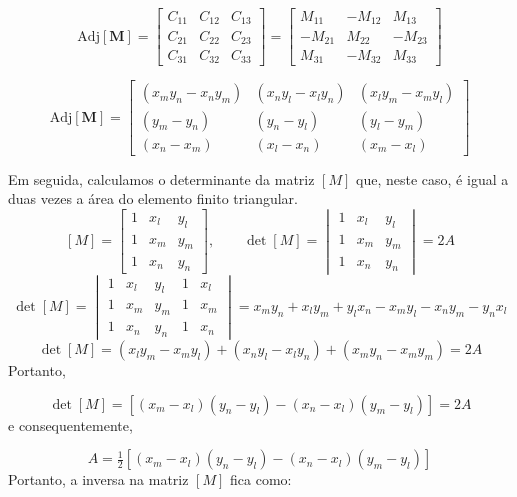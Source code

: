 \documentclass[
12pt,
a4paper,
oneside,
chapter=TITLE,
sumario=tradicional
]{abntex2}
\begin{document}
$$
\text{Adj}[\mathbf{M}] =
\begin{bmatrix}
	C_{11} & C_{12} & C_{13} \\
	C_{21} & C_{22} & C_{23} \\
	C_{31} & C_{32} & C_{33}
\end{bmatrix}
=
\begin{bmatrix}
	M_{11} & -M_{12} & M_{13} \\
	-M_{21} & M_{22} & -M_{23} \\
	M_{31} & -M_{32} & M_{33}
\end{bmatrix}
$$

\begin{equation} %
	\text{Adj}[\mathbf{M}] =
	\begin{bmatrix}
		(x_m y_n - x_n y_m) & (x_n y_l - x_l y_n) & (x_l y_m - x_m y_l) \\
		(y_m - y_n) & (y_n - y_l) & (y_l - y_m) \\
		(x_n - x_m) & (x_l - x_n) & (x_m - x_l)
	\end{bmatrix}
	\label{eq:A_002}
\end{equation}

Em seguida, calculamos o determinante da matriz $[M]$ que, neste caso, é igual a duas vezes a área do elemento finito triangular.
$$
[M] =
\begin{bmatrix}
	1 & x_l & y_l \\
	1 & x_m & y_m \\
	1 & x_n & y_n
\end{bmatrix},
\qquad
\det[M] =
\begin{vmatrix}
	1 & x_l & y_l \\
	1 & x_m & y_m \\
	1 & x_n & y_n
\end{vmatrix}
= 2A
$$
$$
\det[M] =
\begin{vmatrix}
	1 & x_l & y_l & 1 & x_l \\
	1 & x_m & y_m & 1 & x_m \\
	1 & x_n & y_n & 1 & x_n
\end{vmatrix}
= x_m y_n + x_l y_m + y_l x_n - x_m y_l - x_n y_m - y_n x_l
$$
$$
\det[M] = (x_l y_m - x_m y_l) + (x_n y_l - x_l y_n) + (x_m y_n - x_m y_m) = 2A
$$
Portanto,

\begin{equation} %
	\det[M] = \left[ (x_m - x_l)(y_n - y_l) - (x_n - x_l)(y_m - y_l) \right] = 2A 
	\label{eq:A_003}
\end{equation}
e consequentemente,


\begin{equation} %
	A = \tfrac{1}{2} \left[ (x_m - x_l)(y_n - y_l) - (x_n - x_l)(y_m - y_l) \right] 
	\label{eq:A_004}
\end{equation}
Portanto, a inversa na matriz $[M]$ fica como:
\end{document}
